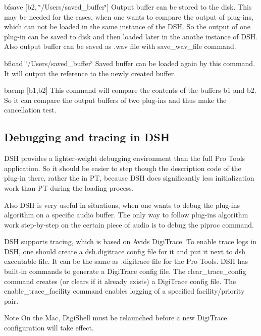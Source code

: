 \begin{DoxyEnumerate}
\item {\ttfamily bfsave \mbox{[}b2, \char`\"{}/\+Users/saved\+\_\+buffer\char`\"{}\mbox{]}} Output buffer can be stored to the disk. This may be needed for the cases, when one wants to compare the output of plug-\/ins, which can not be loaded in the same instance of the D\+S\+H. So the output of one plug-\/in can be saved to disk and then loaded later in the anothe instance of D\+S\+H. Also output buffer can be saved as .wav file with {\ttfamily save\+\_\+wav\+\_\+file} command. ~\newline
  
\item {\ttfamily bfload \char`\"{}/\+Users/saved\+\_\+buffer\char`\"{}} Saved buffer can be loaded again by this command. It will output the reference to the newly created buffer. ~\newline
  
\item {\ttfamily bacmp \mbox{[}b1,b2\mbox{]}} This command will compare the contents of the buffers b1 and b2. So it can compare the output buffers of two plug-\/ins and thus make the cancellation test. ~\newline
  
\end{DoxyEnumerate}



 \hypertarget{a00365_dsh_guide_03_debugging_and_tracing}{}\subsection{Debugging and tracing in D\+S\+H}\label{a00365_dsh_guide_03_debugging_and_tracing}
 D\+S\+H provides a lighter-\/weight debugging environment than the full Pro Tools application. So it should be easier to step though the description code of the plug-\/in there, rather the in P\+T, because D\+S\+H does significantly less initialization work than P\+T during the loading process.

Also D\+S\+H is very useful in situations, when one wants to debug the plug-\/in\textquotesingle{}s algorithm on a specific audio buffer. The only way to follow plug-\/in\textquotesingle{}s algorithm work step-\/by-\/step on the certain piece of audio is to debug the {\ttfamily piproc} command.

D\+S\+H supports tracing, which is based on Avid\textquotesingle{}s Digi\+Trace. To enable trace logs in D\+S\+H, one should create a dsh.\+digitrace config file for it and put it next to dsh executable file. It can be the same as .digitrace file for the Pro Tools. D\+S\+H has built-\/in commands to generate a Digi\+Trace config file. The clear\+\_\+trace\+\_\+config command creates (or clears if it already exists) a Digi\+Trace config file. The enable\+\_\+trace\+\_\+facility command enables logging of a specified facility/priority pair. \begin{DoxyNote}{Note}
On the Mac, Digi\+Shell must be relaunched before a new Digi\+Trace configuration will take effect.
\end{DoxyNote}


